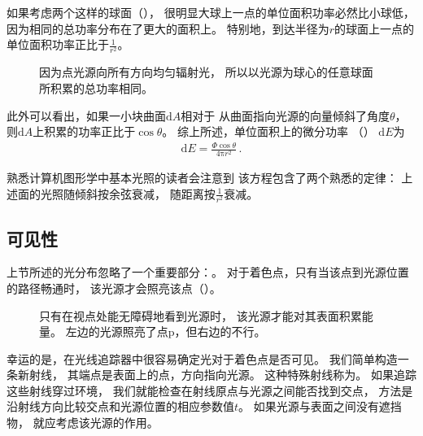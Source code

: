 如果考虑两个这样的球面（），
很明显大球上一点的单位面积功率必然比小球低，
因为相同的总功率分布在了更大的面积上。
特别地，到达半径为$r$的球面上一点的单位面积功率正比于$\displaystyle\frac{1}{r^2}$。
\begin{figure}
      \centering
      \caption{因为点光源向所有方向均匀辐射光，
            所以以光源为球心的任意球面所积累的总功率相同。}
      \label{fig:1.4}
\end{figure}

此外可以看出，如果一小块曲面$\mathrm{d}A$相对于
从曲面指向光源的向量倾斜了角度$\theta$，
则$\mathrm{d}A$上积累的功率正比于$\cos{\theta}$。
综上所述，单位面积上的微分功率
（）
$\mathrm{d}E$为
\begin{align*}
      \mathrm{d}E=\frac{\varPhi\cos{\theta}}{4\mathrm{\pi}r^2}\,.
\end{align*}

熟悉计算机图形学中基本光照的读者会注意到
该方程包含了两个熟悉的定律：
上述面的光照随倾斜按余弦衰减，
随距离按$\displaystyle\frac{1}{r^2}$衰减。

\subsection{可见性}\label{sub:可见性}

上节所述的光分布忽略了一个重要部分：。
对于着色点，只有当该点到光源位置的路径畅通时，
该光源才会照亮该点（）。
\begin{figure}
      \centering
      \caption{只有在视点处能无障碍地看到光源时，
            该光源才能对其表面积累能量。
            左边的光源照亮了点p，但右边的不行。}\label{fig:1.5}
\end{figure}

幸运的是，在光线追踪器中很容易确定光对于着色点是否可见。
我们简单构造一条新射线，
其端点是表面上的点，方向指向光源。
这种特殊射线称为。
如果追踪这些射线穿过环境，
我们就能检查在射线原点与光源之间能否找到交点，
方法是沿射线方向比较交点和光源位置的相应参数值$t$。
如果光源与表面之间没有遮挡物，
就应考虑该光源的作用。

